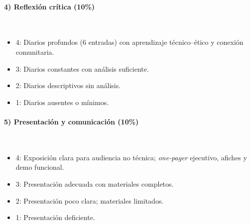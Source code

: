 \documentclass[a4,11pt]{aleph-notas}
\begin{document}
\paragraph{4) Reflexión crítica (10\%)}~
\begin{itemize}
    \item {4:} Diarios profundos (6 entradas) con aprendizaje técnico--ético y conexión comunitaria.
    \item {3:} Diarios constantes con análisis suficiente.
    \item {2:} Diarios descriptivos sin análisis.
    \item {1:} Diarios ausentes o mínimos.
\end{itemize}

\paragraph{5) Presentación y comunicación (10\%)}~
\begin{itemize}
    \item {4:} Exposición clara para audiencia no técnica; \emph{one-pager} ejecutivo, afiches y demo funcional.
    \item {3:} Presentación adecuada con materiales completos.
    \item {2:} Presentación poco clara; materiales limitados.
    \item {1:} Presentación deficiente.
\end{itemize}
\end{document}
